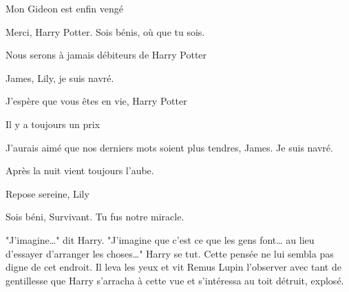 \begin{center}Mon Gideon est enfin vengé\end{center}



\begin{center}Merci, Harry Potter. Sois bénis, où que tu sois.\end{center}



\begin{center}Nous serons à jamais débiteurs de Harry Potter\end{center}



\begin{center}James, Lily, je suis navré.\end{center}



\begin{center}J'espère que vous êtes en vie, Harry Potter\end{center}



\begin{center}Il y a toujours un prix\end{center}



\begin{center}J'aurais aimé que nos derniers mots soient plus tendres, James. Je suis navré.\end{center}



\begin{center}Après la nuit vient toujours l'aube.\end{center}



\begin{center}Repose sereine, Lily\end{center}



\begin{center}Sois béni, Survivant. Tu fus notre miracle.\end{center}


"J'imagine…" dit Harry. "J'imagine que c'est ce que les gens font… au lieu d'essayer d'arranger les choses…" Harry se tut. Cette pensée ne lui sembla pas digne de cet endroit. Il leva les yeux et vit Remus Lupin l'observer avec tant de gentillesse que Harry s'arracha à cette vue et s'intéressa au toit détruit, explosé.

